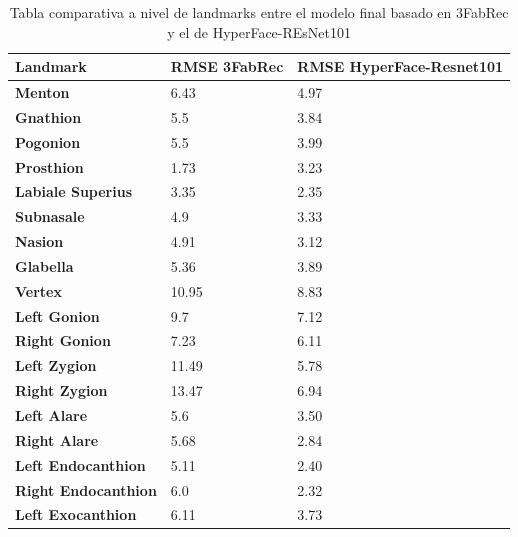         \begin{table}[!ht]
            \centering
            \caption{Tabla comparativa a nivel de landmarks entre el modelo final basado en 3FabRec y el de HyperFace-REsNet101}
            \begin{tabular}{|l|l|l|}
            \hline
                \cellcolor{gray!25}\textbf{Landmark} & \cellcolor{gray!25}\textbf{RMSE 3FabRec} & \cellcolor{gray!25}\textbf{RMSE HyperFace-Resnet101} \\ \hline
                \textbf{Menton} & 6.43 & \cellcolor{green!25} 4.97 \\ \hline
                \textbf{Gnathion} & 5.5 & \cellcolor{green!25}3.84 \\ \hline
                \textbf{Pogonion} & 5.5 & \cellcolor{green!25}3.99 \\ \hline
                \textbf{Prosthion} & \cellcolor{green!25}1.73 & 3.23 \\ \hline
                \textbf{Labiale Superius} & 3.35 & \cellcolor{green!25}2.35 \\ \hline
                \textbf{Subnasale} & 4.9 & \cellcolor{green!25}3.33 \\ \hline
                \textbf{Nasion} & 4.91 & \cellcolor{green!25}3.12 \\ \hline
                \textbf{Glabella} & 5.36 & \cellcolor{green!25}3.89 \\ \hline
                \textbf{Vertex} & 10.95 & \cellcolor{green!25}8.83 \\ \hline
                \textbf{Left Gonion} & 9.7 & \cellcolor{green!25}7.12 \\ \hline
                \textbf{Right Gonion} & 7.23 & \cellcolor{green!25}6.11 \\ \hline
                \textbf{Left Zygion} & 11.49 & \cellcolor{green!25}5.78 \\ \hline
                \textbf{Right Zygion} & 13.47 & \cellcolor{green!25}6.94 \\ \hline
                \textbf{Left Alare} & 5.6 & \cellcolor{green!25}3.50 \\ \hline
                \textbf{Right Alare} & 5.68 & \cellcolor{green!25}2.84 \\ \hline
                \textbf{Left Endocanthion} & 5.11 & \cellcolor{green!25}2.40 \\ \hline
                \textbf{Right Endocanthion} & 6.0 & \cellcolor{green!25}2.32 \\ \hline
                \textbf{Left Exocanthion} & 6.11 & \cellcolor{green!25}3.73 \\ \hline

\end{tabular}
\end{table}
